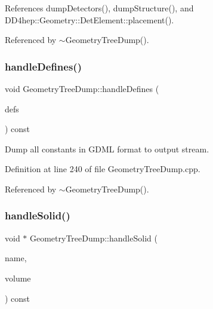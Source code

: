 References dump\+Detectors(), dump\+Structure(), and D\+D4hep\+::\+Geometry\+::\+Det\+Element\+::placement().



Referenced by $\sim$\+Geometry\+Tree\+Dump().

\hypertarget{class_d_d4hep_1_1_geometry_1_1_geometry_tree_dump_ab51d5208b192c59e1863a047f7dac2c2}{}\label{class_d_d4hep_1_1_geometry_1_1_geometry_tree_dump_ab51d5208b192c59e1863a047f7dac2c2} 
\subsubsection{\texorpdfstring{handle\+Defines()}{handleDefines()}}
{\footnotesize\ttfamily void Geometry\+Tree\+Dump\+::handle\+Defines (\begin{DoxyParamCaption}\item[{const \hyperlink{class_d_d4hep_1_1_geometry_1_1_l_c_d_d_a05cb11e7355772c7b0794bcca59bf477}{L\+C\+D\+D\+::\+Handle\+Map} \&}]{defs }\end{DoxyParamCaption}) const\hspace{0.3cm}{\ttfamily [virtual]}}



Dump all constants in G\+D\+ML format to output stream. 



Definition at line 240 of file Geometry\+Tree\+Dump.\+cpp.



Referenced by $\sim$\+Geometry\+Tree\+Dump().

\hypertarget{class_d_d4hep_1_1_geometry_1_1_geometry_tree_dump_ac406833fab65fe5a54aa8cb983a30bd5}{}\label{class_d_d4hep_1_1_geometry_1_1_geometry_tree_dump_ac406833fab65fe5a54aa8cb983a30bd5} 
\subsubsection{\texorpdfstring{handle\+Solid()}{handleSolid()}}
{\footnotesize\ttfamily void $\ast$ Geometry\+Tree\+Dump\+::handle\+Solid (\begin{DoxyParamCaption}\item[{const std\+::string \&}]{name,  }\item[{const T\+Geo\+Shape $\ast$}]{volume }\end{DoxyParamCaption}) const\hspace{0.3cm}{\ttfamily [virtual]}}



